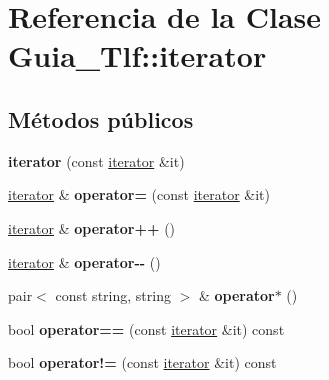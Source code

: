 \hypertarget{classGuia__Tlf_1_1iterator}{}\section{Referencia de la Clase Guia\+\_\+\+Tlf\+:\+:iterator}
\label{classGuia__Tlf_1_1iterator}
\subsection*{Métodos públicos}
\begin{DoxyCompactItemize}
\item 
\mbox{\label{classGuia__Tlf_1_1iterator_a2b1e97dfe19077aae53ee973c824dbcd}} 
{\bfseries iterator} (const \hyperlink{classGuia__Tlf_1_1iterator}{iterator} \&it)
\item 
\mbox{\label{classGuia__Tlf_1_1iterator_a8a2678bac0fc0f1653742632aaa7374d}} 
\hyperlink{classGuia__Tlf_1_1iterator}{iterator} \& {\bfseries operator=} (const \hyperlink{classGuia__Tlf_1_1iterator}{iterator} \&it)
\item 
\mbox{\label{classGuia__Tlf_1_1iterator_a56459b71209d613d0d4a2a177db624d8}} 
\hyperlink{classGuia__Tlf_1_1iterator}{iterator} \& {\bfseries operator++} ()
\item 
\mbox{\label{classGuia__Tlf_1_1iterator_ab723846613dd8553a30d1d8a5c3295d9}} 
\hyperlink{classGuia__Tlf_1_1iterator}{iterator} \& {\bfseries operator-\/-\/} ()
\item 
\mbox{\label{classGuia__Tlf_1_1iterator_aad0b08e30432a57bae7c666ae8cadf33}} 
pair$<$ const string, string $>$ \& {\bfseries operator$\ast$} ()
\item 
\mbox{\label{classGuia__Tlf_1_1iterator_a666b4ec97bf0113079052d7fb1c06815}} 
bool {\bfseries operator==} (const \hyperlink{classGuia__Tlf_1_1iterator}{iterator} \&it) const
\item 
\mbox{\label{classGuia__Tlf_1_1iterator_ac90ecfb8fb9506c9fcddfdcabf9af1a3}} 
bool {\bfseries operator!=} (const \hyperlink{classGuia__Tlf_1_1iterator}{iterator} \&it) const
\end{DoxyCompactItemize}
